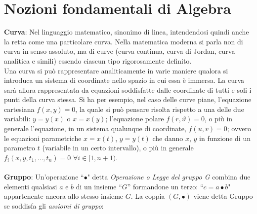 \documentclass[a4paper,12pt]{tesiinfo}
\begin{document}
\chapter{Nozioni fondamentali di Algebra}
\textbf{Curva}: Nel linguaggio matematico, sinonimo di linea, intendendosi quindi anche la retta come una particolare curva. Nella matematica moderna si parla non di curva in senso assoluto, ma di curve (curva continua, curva di Jordan, curva analitica e simili) essendo ciascun tipo rigorosamente definito. %
\\
Una curva si pu\`o rappresentare analiticamente in varie maniere qualora si introduca un sistema di coordinate nello spazio in cui essa \`e immersa. La curva sar\`a allora rappresentata da equazioni soddisfatte dalle coordinate di tutti e soli i punti della curva stessa. Si ha per esempio, nel caso delle curve piane, l'equazione cartesiana $f (x, y)=0$, la quale si pu\`o pensare risolta rispetto a una delle due variabili: $y=y (x)$ o $x=x (y)$; l'equazione polare $f (r, \vartheta)=0$, o pi\`u in generale l'equazione, in un sistema qualunque di coordinate, $f (u, v)=0$; ovvero le equazioni parametriche $x=x (t)$, $y=y (t)$ che danno $x$, $y$ in funzione di un parametro $t$ (variabile in un certo intervallo), o pi\`u in generale $f_i (x, y, t_1 , \ldots, t_n )=0$ $\forall i \in [1, n+1)$.
%
%
%
\\
\\
\textbf{Gruppo}: Un'operazione ``$\bullet$" detta \textit{Operazione o Legge del gruppo G} combina due elementi qualsiasi $a$ e $b$ di un insieme ``$G$'' formandone un terzo: ``$c = a\bullet b$" appartenente ancora allo stesso insieme $G$. 
La coppia $ (G, \bullet)$ viene detta Gruppo se soddisfa gli \textit{assiomi di gruppo}:
\end{document}
